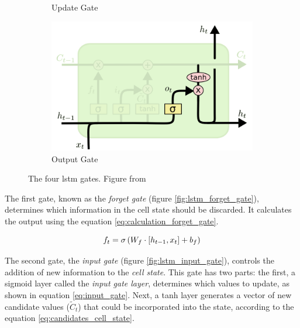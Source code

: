 \begin{figure}[htb]
\begin{subfigure}{.45\linewidth}
        \caption{Update Gate}
        \label{fig:lstm_update_gate}
    \end{subfigure}
        \begin{subfigure}{.45\linewidth}
        \centering
        \includegraphics[width=1.0\linewidth]{./assets/img/output_gate.png}
        \caption{Output Gate}
        \label{fig:lstm_output_gate}
    \end{subfigure}
    \caption{The four \gls{lstm} gates. Figure from \cite{Olah_2015}}
    \label{fig:lstm_gates}
\end{figure}

\noindent
The first gate, known as the \textit{forget gate} (figure \ref{fig:lstm_forget_gate}), determines which information in the cell state should be discarded. It calculates the output using the equation \ref{eq:calculation_forget_gate}.

\begin{equation}
    \centering
    f_t = \sigma \left(W_f \cdot [h_{t-1}, x_t] + b_f \right)
    \label{eq:calculation_forget_gate}
\end{equation}

\noindent
The second gate, the \textit{input gate} (figure \ref{fig:lstm_input_gate}), controls the addition of new information to the \textit{cell state}. This gate has two parts: the first, a sigmoid layer called the \textit{input gate layer}, determines which values to update, as shown in equation \ref{eq:input_gate}. Next, a \gls{tanh} layer generates a vector of new candidate values ($\tilde{C}_t$) that could be incorporated into the state, according to the equation \ref{eq:candidates_cell_state}.

